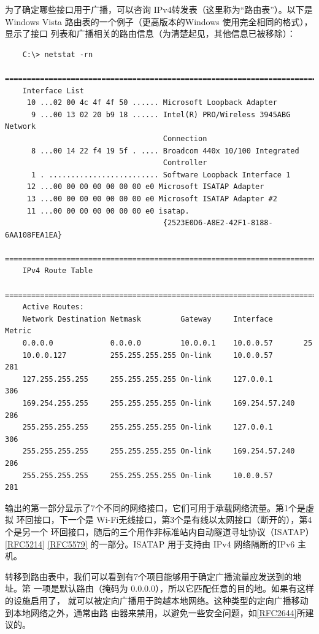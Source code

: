为了确定哪些接口用于广播，可以咨询 IPv4转发表（这里称为“路由表”）。以下是
Windows Vista 路由表的一个例子（更高版本的Windows 使用完全相同的格式），显示了接口
列表和广播相关的路由信息（为清楚起见，其他信息已被移除）：

\begin{verbatim}
    C:\> netstat -rn
    =======================================================================
    Interface List
     10 ...02 00 4c 4f 4f 50 ...... Microsoft Loopback Adapter
      9 ...00 13 02 20 b9 18 ...... Intel(R) PRO/Wireless 3945ABG Network
                                    Connection
      8 ...00 14 22 f4 19 5f . .... Broadcom 440x 10/100 Integrated
                                    Controller
      1 . ......................... Software Loopback Interface 1
     12 ...00 00 00 00 00 00 00 e0 Microsoft ISATAP Adapter
     13 ...00 00 00 00 00 00 00 e0 Microsoft ISATAP Adapter #2
     11 ...00 00 00 00 00 00 00 e0 isatap.
                                    {2523E0D6-A8E2-42F1-8188-6AA108FEA1EA}
    =======================================================================
    IPv4 Route Table
    =======================================================================
    Active Routes:
    Network Destination Netmask         Gateway     Interface       Metric
    0.0.0.0             0.0.0.0         10.0.0.1    10.0.0.57       25
    10.0.0.127          255.255.255.255 On-link     10.0.0.57       281
    127.255.255.255     255.255.255.255 On-link     127.0.0.1       306
    169.254.255.255     255.255.255.255 On-link     169.254.57.240  286
    255.255.255.255     255.255.255.255 On-link     127.0.0.1       306
    255.255.255.255     255.255.255.255 On-link     169.254.57.240  286
    255.255.255.255     255.255.255.255 On-link     10.0.0.57       281
\end{verbatim}

输出的第一部分显示了7个不同的网络接口，它们可用于承载网络流量。第1个是虚拟
环回接口，下一个是 Wi-Fi无线接口，第3个是有线以太网接口（断开的），第4个是另一个
环回接口，随后的三个用作非标准站内自动隧道寻址协议（ISATAP）\href{https://www.rfc-editor.org/rfc/rfc5214}{[RFC5214]} \href{https://www.rfc-editor.org/rfc/rfc5579}{[RFC5579]}
的一部分。ISATAP 用于支持由 IPv4 网络隔断的IPv6 主机。

转移到路由表中，我们可以看到有7个项目能够用于确定广播流量应发送到的地址。第
一项是默认路由（掩码为 0.0.0.0），所以它匹配任意的目的地。如果有这样的设施启用了，
就可以被定向广播用于跨越本地网络。这种类型的定向广播移动到本地网络之外，通常由路
由器来禁用，以避免一些安全问题，如\href{https://www.rfc-editor.org/rfc/rfc2644}{[RFC2644]}所建议的。

